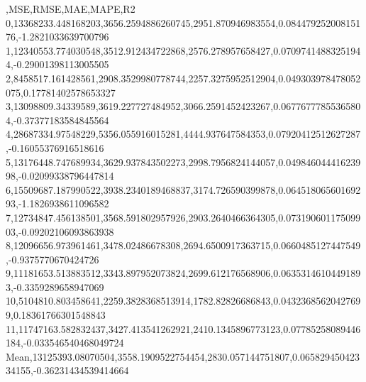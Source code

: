,MSE,RMSE,MAE,MAPE,R2
0,13368233.448168203,3656.2594886260745,2951.870946983554,0.08447925200815176,-1.2821033639700796
1,12340553.774030548,3512.912434722868,2576.278957658427,0.07097414883251944,-0.29001398113005505
2,8458517.161428561,2908.3529980778744,2257.3275952512904,0.049303978478052075,0.17781402578653327
3,13098809.34339589,3619.227727484952,3066.2591452423267,0.06776777855365804,-0.37377183584845564
4,28687334.97548229,5356.055916015281,4444.937647584353,0.07920412512627287,-0.16055376916518616
5,13176448.747689934,3629.937843502273,2998.7956824144057,0.04984604441623998,-0.02099338796447814
6,15509687.187990522,3938.2340189468837,3174.726590399878,0.06451806560169293,-1.1826938611096582
7,12734847.456138501,3568.591802957926,2903.2640466364305,0.07319060117509903,-0.09202106093863938
8,12096656.973961461,3478.02486678308,2694.6500917363715,0.0660485127447549,-0.9375770670424726
9,11181653.513883512,3343.897952073824,2699.612176568906,0.06353146104491893,-0.3359289658947069
10,5104810.803458641,2259.3828368513914,1782.82826686843,0.04323685620427699,0.18361766301548843
11,11747163.582832437,3427.413541262921,2410.1345896773123,0.07785258089446184,-0.033546540468049724
Mean,13125393.08070504,3558.1909522754454,2830.057144751807,0.06582945042334155,-0.36231434539414664
